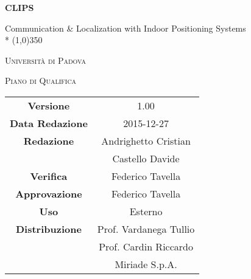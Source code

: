 \documentclass{article}
\author{Andrighetto Cristian, Castello Davide}
\date{27/12/2015}
\begin{document}
	\begin{titlepage}
		\centering
	{\huge\bfseries CLIPS\par}
	Communication \& Localization with Indoor Positioning Systems \\*
	\line(1,0){350} \\
	{\scshape\LARGE Università di Padova \par}
	\vspace{1cm}
	{\scshape\Large Piano di Qualifica \par}
	\logo
	\newpage
		\begin{tabular}{c|c}
			{\hfill \textbf{Versione}} 			& 1.00			\\
			{\hfill\textbf{Data Redazione}} 		& 2015-12-27  		\\ 
			{\hfill\textbf{Redazione}} 			&  Andrighetto Cristian \\ 
											& Castello Davide       \\
			{\hfill\textbf{Verifica}} 				&  Federico Tavella   \\
			{\hfill\textbf{Approvazione}} 		& Federico Tavella \\
			{\hfill\textbf{Uso}} 					& Esterno			\\
			{\hfill\textbf{Distribuzione}} 			& Prof. Vardanega Tullio \\
											& Prof. Cardin Riccardo \\
											& Miriade S.p.A.
		\end{tabular}
	\end{titlepage}
	
	\newpage
	\pagestyle{myfront}
		
	
	\newpage
		\tableofcontents
	
	\newpage
		\listoftables
	
	\label{LastFrontPage}
	\newpage
		\pagestyle{mymain}
	
\newpage
	
\newpage
	
\newpage
	
\newpage
	
\newpage
	
\label{LastPage}
\end{document}
